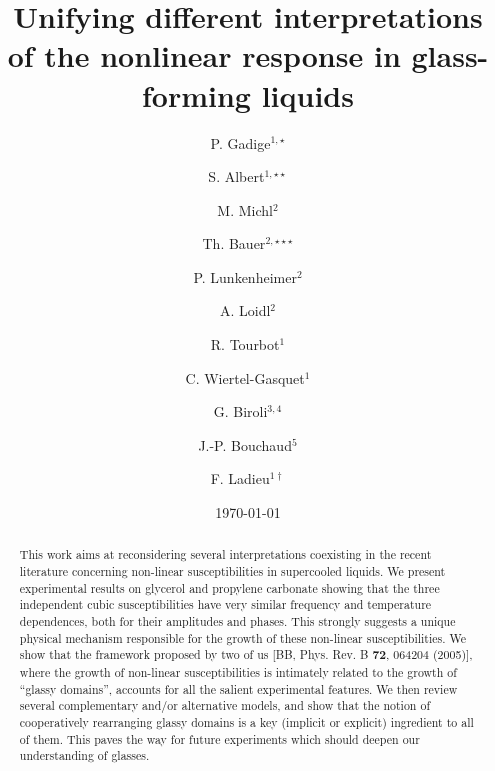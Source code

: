 \documentclass[single column,pre]{revtex4}
\begin{document}
\title{Unifying different interpretations of the nonlinear response in glass-forming liquids}

\author{P. Gadige$^{1,\star}$}
\author{S. Albert$^{1, \star \star}$}
\author{M. Michl$^2$}
\author{Th. Bauer$^{2, \star \star \star}$}
\author{P. Lunkenheimer$^2$}
\author{A. Loidl$^2$}
\author{R. Tourbot$^1$}
\author{C. Wiertel-Gasquet$^1$}
\author{G. Biroli$^{3,4}$}
\author{J.-P. Bouchaud$^5$}
\author{F. Ladieu$^{1 \dagger}$}



\date{\today}

\begin{abstract}
This work aims at reconsidering several interpretations coexisting in the recent literature concerning non-linear susceptibilities in supercooled liquids. We present experimental results on glycerol and propylene carbonate showing that the three independent cubic susceptibilities have very similar frequency and temperature dependences, both for their amplitudes and phases. This strongly suggests a unique physical mechanism responsible for the growth of these non-linear susceptibilities. We show that the framework proposed by two of us [BB, Phys. Rev. B \textbf{72}, 064204 (2005)], where the growth of non-linear susceptibilities is intimately related to the growth of ``glassy domains'', accounts for all the salient experimental features. We then review several complementary and/or alternative models, and show that the notion of cooperatively rearranging glassy domains is a key (implicit or explicit) ingredient to all of them. This paves the way for future experiments which should deepen our understanding of glasses.
\end{abstract}
\end{document}
